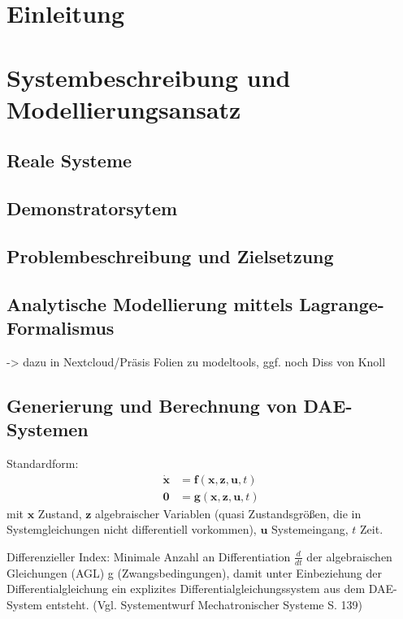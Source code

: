 \pagestyle{scrheadings}

\chapter{Einleitung}


\chapter{Systembeschreibung und Modellierungsansatz}
\section{Reale Systeme}

\section{Demonstratorsytem}

\section{Problembeschreibung und Zielsetzung}

\section{Analytische Modellierung mittels Lagrange-Formalismus}
-> dazu in Nextcloud/Präsis Folien zu modeltools, ggf. noch Diss von Knoll

\section{Generierung und Berechnung von DAE-Systemen}
Standardform:
	\begin{align}\label{eq:dae_std}
		\pmb{\dot{x}} &= \pmb{f}(\pmb{x}, \pmb{z}, \pmb{u}, t) \\
		\pmb{0} &= \pmb{g}(\pmb{x}, \pmb{z}, \pmb{u}, t)
	\end{align}
mit $\pmb{x}$ Zustand, $\pmb{z}$ algebraischer Variablen (quasi Zustandsgrößen, die in Systemgleichungen nicht differentiell vorkommen), $\pmb{u}$ Systemeingang, $t$ Zeit.

Differenzieller Index: Minimale Anzahl an Differentiation $\frac{d}{dt}$ der algebraischen Gleichungen (AGL) g (Zwangsbedingungen), damit unter Einbeziehung der Differentialgleichung ein explizites Differentialgleichungssystem aus dem DAE-System entsteht. (Vgl. Systementwurf Mechatronischer Systeme S. 139)

